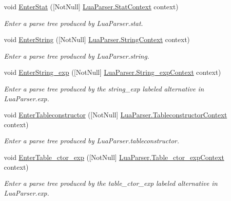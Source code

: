 \begin{DoxyCompactItemize}
void \mbox{\hyperlink{classzlua_1_1_compiler_a5edb39400f408df076c2ac83554f08eb}{Enter\+Stat}} (\mbox{[}Not\+Null\mbox{]} \mbox{\hyperlink{classzlua_1_1_lua_parser_1_1_stat_context}{Lua\+Parser.\+Stat\+Context}} context)
\begin{DoxyCompactList}\small\item\em Enter a parse tree produced by Lua\+Parser.\+stat. \end{DoxyCompactList}\item 
void \mbox{\hyperlink{classzlua_1_1_compiler_a994696673f9c1c41e00d65b1e7bb1d39}{Enter\+String}} (\mbox{[}Not\+Null\mbox{]} \mbox{\hyperlink{classzlua_1_1_lua_parser_1_1_string_context}{Lua\+Parser.\+String\+Context}} context)
\begin{DoxyCompactList}\small\item\em Enter a parse tree produced by Lua\+Parser.\+string. \end{DoxyCompactList}\item 
void \mbox{\hyperlink{classzlua_1_1_compiler_aed4778e096225183ba6add21e832faaf}{Enter\+String\+\_\+exp}} (\mbox{[}Not\+Null\mbox{]} \mbox{\hyperlink{classzlua_1_1_lua_parser_1_1_string__exp_context}{Lua\+Parser.\+String\+\_\+exp\+Context}} context)
\begin{DoxyCompactList}\small\item\em Enter a parse tree produced by the {\ttfamily string\+\_\+exp} labeled alternative in Lua\+Parser.\+exp. \end{DoxyCompactList}\item 
void \mbox{\hyperlink{classzlua_1_1_compiler_af18957aed84481c7763b249286bd28b2}{Enter\+Tableconstructor}} (\mbox{[}Not\+Null\mbox{]} \mbox{\hyperlink{classzlua_1_1_lua_parser_1_1_tableconstructor_context}{Lua\+Parser.\+Tableconstructor\+Context}} context)
\begin{DoxyCompactList}\small\item\em Enter a parse tree produced by Lua\+Parser.\+tableconstructor. \end{DoxyCompactList}\item 
void \mbox{\hyperlink{classzlua_1_1_compiler_afbc0c7f12e4f12a6c032ce90cf17b2ef}{Enter\+Table\+\_\+ctor\+\_\+exp}} (\mbox{[}Not\+Null\mbox{]} \mbox{\hyperlink{classzlua_1_1_lua_parser_1_1_table__ctor__exp_context}{Lua\+Parser.\+Table\+\_\+ctor\+\_\+exp\+Context}} context)
\begin{DoxyCompactList}\small\item\em Enter a parse tree produced by the {\ttfamily table\+\_\+ctor\+\_\+exp} labeled alternative in Lua\+Parser.\+exp. \end{DoxyCompactList}\item 

\end{DoxyCompactItemize}
